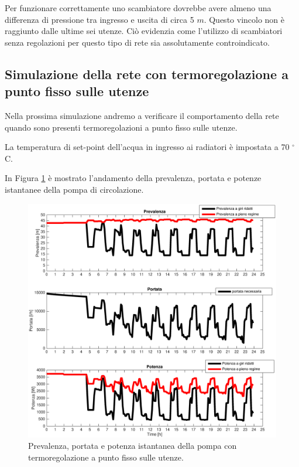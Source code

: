 \documentclass[laurea,oneside,11pt]{USiena_tesiLM}
\begin{document}
Per funzionare correttamente uno scambiatore dovrebbe avere almeno una differenza di pressione tra ingresso e uscita di circa 5 $m$. Questo vincolo non è raggiunto dalle ultime sei utenze. 
Ciò evidenzia come l'utilizzo di scambiatori senza regolazioni per questo tipo di rete sia assolutamente controindicato.


\subsection{Simulazione della rete con termoregolazione a punto fisso sulle utenze}
Nella prossima simulazione andremo a verificare il comportamento della rete quando sono presenti termoregolazioni a punto fisso sulle utenze. 

La temperatura di set-point dell'acqua in ingresso ai radiatori è impostata a 70 $^{\circ}$C.

In Figura \ref{fig:sim_regmandata} è mostrato l'andamento della prevalenza, portata e potenze istantanee della pompa di circolazione.

\begin{figure}[!ht]
\centering
\includegraphics[width=\textwidth]{figure/sim_regmandata} 
\caption{Prevalenza, portata e potenza istantanea della pompa con termoregolazione a punto fisso sulle utenze. }
\label{fig:sim_regmandata}
\end{figure}
\end{document}
